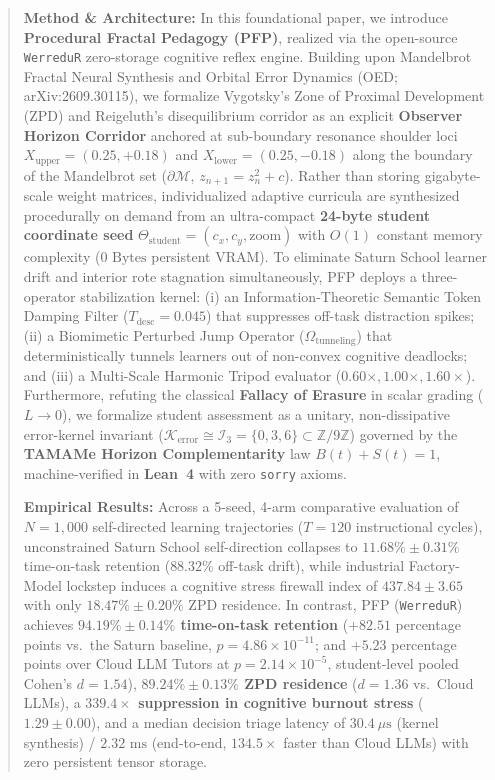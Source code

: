 \documentclass[10pt,twocolumn,a4paper]{article}
\begin{document}
\begin{@twocolumnfalse}
\begin{abstract}
      \noindent \textbf{Method \& Architecture:} In this foundational paper, we introduce \textbf{Procedural Fractal Pedagogy (PFP)}, realized via the open-source \texttt{WerreduR} zero-storage cognitive reflex engine. Building upon Mandelbrot Fractal Neural Synthesis and Orbital Error Dynamics (OED; arXiv:2609.30115), we formalize Vygotsky's Zone of Proximal Development (ZPD) and Reigeluth's disequilibrium corridor as an explicit \textbf{Observer Horizon Corridor} anchored at sub-boundary resonance shoulder loci $X_{\text{upper}} = (0.25, +0.18)$ and $X_{\text{lower}} = (0.25, -0.18)$ along the boundary of the Mandelbrot set ($\partial\mathcal{M}$, $z_{n+1} = z_n^2 + c$). Rather than storing gigabyte-scale weight matrices, individualized adaptive curricula are synthesized procedurally on demand from an ultra-compact \textbf{24-byte student coordinate seed} $\Theta_{\text{student}} = (c_x, c_y, \text{zoom})$ with $O(1)$ constant memory complexity ($0\text{ Bytes}$ persistent VRAM). To eliminate Saturn School learner drift and interior rote stagnation simultaneously, PFP deploys a three-operator stabilization kernel: (i) an Information-Theoretic Semantic Token Damping Filter ($T_{\text{desc}} = 0.045$) that suppresses off-task distraction spikes; (ii) a Biomimetic Perturbed Jump Operator ($\Omega_{\text{tunneling}}$) that deterministically tunnels learners out of non-convex cognitive deadlocks; and (iii) a Multi-Scale Harmonic Tripod evaluator ($0.60\times, 1.00\times, 1.60\times$). Furthermore, refuting the classical \textbf{Fallacy of Erasure} in scalar grading ($L \to 0$), we formalize student assessment as a unitary, non-dissipative error-kernel invariant ($\mathcal{K}_{\text{error}} \cong \mathcal{I}_3 = \{0, 3, 6\} \subset \mathbb{Z}/9\mathbb{Z}$) governed by the \textbf{TAMAMe Horizon Complementarity} law $B(t) + S(t) = 1$, machine-verified in \textbf{Lean~4} with zero \texttt{sorry} axioms. \par\vspace{4pt}
      \noindent \textbf{Empirical Results:} Across a 5-seed, 4-arm comparative evaluation of $N = 1,000$ self-directed learning trajectories ($T = 120$ instructional cycles), unconstrained Saturn School self-direction collapses to $11.68\% \pm 0.31\%$ time-on-task retention ($88.32\%$ off-task drift), while industrial Factory-Model lockstep induces a cognitive stress firewall index of $437.84 \pm 3.65$ with only $18.47\% \pm 0.20\%$ ZPD residence. In contrast, PFP (\texttt{WerreduR}) achieves \textbf{$94.19\% \pm 0.14\%$ time-on-task retention} ($+82.51$ percentage points vs.\ the Saturn baseline, $p = 4.86 \times 10^{-11}$; and $+5.23$ percentage points over Cloud LLM Tutors at $p = 2.14 \times 10^{-5}$, student-level pooled Cohen's $d = 1.54$), \textbf{$89.24\% \pm 0.13\%$ ZPD residence} ($d = 1.36$ vs.\ Cloud LLMs), a \textbf{$339.4\times$ suppression in cognitive burnout stress} ($1.29 \pm 0.00$), and a median decision triage latency of \textbf{$30.4\ \mu\text{s}$} (kernel synthesis) / \textbf{$2.32\text{ ms}$} (end-to-end, $134.5\times$ faster than Cloud LLMs) with zero persistent tensor storage. \par\vspace{6pt}

\end{abstract}
\end{@twocolumnfalse}
\end{document}
